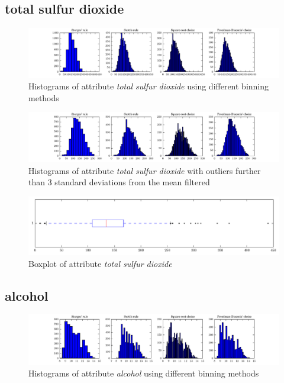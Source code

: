 \documentclass{report}
\begin{document}
\newpage\subsection{total sulfur dioxide}
\begin{figure}[H]
\includegraphics[width=\textwidth]{histograms/total_sulfur_dioxide.pdf}
\caption{Histograms of attribute \emph{total sulfur dioxide} using different binning methods}\end{figure}

\begin{figure}[H]
\includegraphics[width=\textwidth]{histograms/total_sulfur_dioxide_filtered.pdf}
\caption{Histograms of attribute \emph{total sulfur dioxide} with outliers further than 3 standard deviations from the mean filtered}
\end{figure}

\begin{figure}[H]
\includegraphics[width=\textwidth]{boxplots/total_sulfur_dioxide.pdf}
\caption{Boxplot of attribute \emph{total sulfur dioxide}}\end{figure}

\newpage\subsection{alcohol}
\begin{figure}[H]
\includegraphics[width=\textwidth]{histograms/alcohol.pdf}
\caption{Histograms of attribute \emph{alcohol} using different binning methods}\end{figure}
\end{document}
